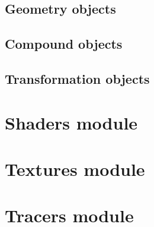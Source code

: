 \documentclass[10pt,a4paper,titlepage,english]{report}
\begin{document}
\section{Geometry objects}

\section{Compound objects}

\section{Transformation objects}



\chapter{Shaders module} %

\chapter{Textures module}

\chapter{Tracers module}


%
%

\begin{thebibliography}{99}

\end{thebibliography}
\end{document}
